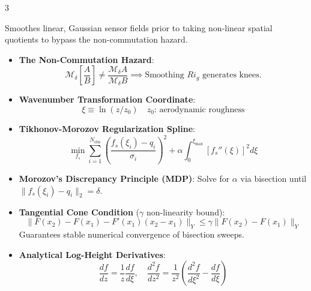 \documentclass[9pt,landscape,letterpaper]{article}
\begin{document}
\begin{multicols}{3}
\footnotesize

\begin{tcolorbox}[cheatsheetbox, title=4. Track A Primitive Field Regularization]
Smoothes linear, Gaussian sensor fields prior to taking non-linear spatial quotients to bypass the non-commutation hazard.
\begin{itemize}
    \item \textbf{The Non-Commutation Hazard}:
    $$\mathcal{M}_\delta \left[ \frac{A}{B} \right] \neq \frac{\mathcal{M}_\delta A}{\mathcal{M}_\delta B} \implies \text{Smoothing } Ri_g \text{ generates knees.}$$
    \item \textbf{Wavenumber Transformation Coordinate}:
    $$\xi \equiv \ln(z / z_0) \quad z_0\text{: aerodynamic roughness}$$
    \item \textbf{Tikhonov-Morozov Regularization Spline}:
    $$\min_{f_s} \sum_{i=1}^{N_{\text{obs}}} \left( \frac{f_s(\xi_i) - q_i}{\sigma_i} \right)^2 + \alpha \int_0^{\xi_{\max}} [f_s''(\xi)]^2 d\xi$$
    \item \textbf{Morozov's Discrepancy Principle (MDP)}: Solve for $\alpha$ via bisection until $\|f_s(\xi_i) - q_i\|_2 = \delta$.
    \item \textbf{Tangential Cone Condition} ($\gamma$ non-linearity bound):
    $$\|F(x_2) - F(x_1) - F'(x_1)(x_2 - x_1)\|_Y \le \gamma \|F(x_2) - F(x_1)\|_Y$$
    Guarantees stable numerical convergence of bisection sweeps.
    \item \textbf{Analytical Log-Height Derivatives}:
    $$\frac{df}{dz} = \frac{1}{z} \frac{df}{d\xi}, \quad \frac{d^2f}{dz^2} = \frac{1}{z^2}\left( \frac{d^2f}{d\xi^2} - \frac{df}{d\xi} \right)$$
\end{itemize}
\end{tcolorbox}
\columnbreak


\end{multicols}
\end{document}
